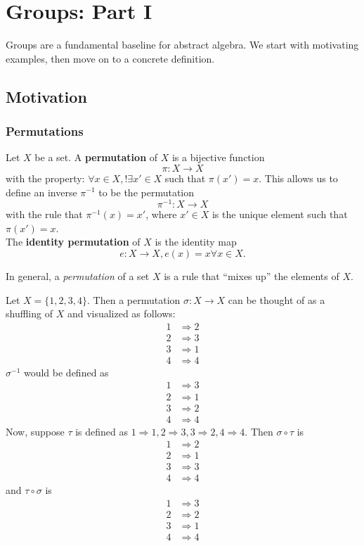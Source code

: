 \documentclass[math1530-lecture-notes]{subfiles}
\begin{document}
\chapter{Groups: Part I}

Groups are a fundamental baseline for abstract algebra. We start with motivating examples, then move
on to a concrete definition.

\section{Motivation}
\subsection{Permutations}

\begin{definition}[Permutations]{}
  Let $X$ be a set. A \textbf{permutation} of $X$ is a bijective function \[\pi: X \to X\] with the
    property: $\forall x\in X, !\exists x'\in X$ such that $\pi(x')=x$. This allows us to define an
    inverse $\pi^{-1}$ to be the permutation \[
    \pi^{-1}:X\to X
  \] with the rule that $\pi^{-1}(x)=x'$, where $x'\in X$ is the unique element such that
  $\pi(x')=x$. \\
  The \textbf{identity permutation} of $X$ is the identity map \[
    e:X\to X, e(x)=x \forall x\in X
  .\] 
\end{definition}
In general, a \textit{permutation} of a set $X$ is a rule that ``mixes up'' the elements of $X$.

\begin{example}
  Let $X =\{1, 2, 3, 4 \} $. Then a permutation $\sigma: X \to X$ can be thought of as a shuffling of $X$ and
  visualized as follows:
  \begin{align*}
    1 &\Rightarrow 2 \\
    2 &\Rightarrow 3 \\
    3 &\Rightarrow 1 \\
    4 &\Rightarrow 4
  \end{align*}
  $\sigma^{-1}$ would be defined as
  \begin{align*}
    1 &\Rightarrow 3\\
    2 &\Rightarrow 1\\
    3 &\Rightarrow 2 \\
    4 &\Rightarrow 4 
  \end{align*}
  Now, suppose $\tau$ is defined as $1\Rightarrow 1, 2\Rightarrow 3, 3\Rightarrow 2, 4\Rightarrow
  4$. Then $\sigma\circ \tau$ is
  \begin{align*}
    1 &\Rightarrow 2 \\
    2 &\Rightarrow 1 \\
    3 &\Rightarrow 3 \\
    4 &\Rightarrow 4
  \end{align*}
  and $\tau\circ \sigma$ is 
  \begin{align*}
    1 &\Rightarrow 3 \\
    2 &\Rightarrow 2 \\
    3 &\Rightarrow 1 \\
    4 &\Rightarrow 4 
  \end{align*}
\end{example}
\end{document}
